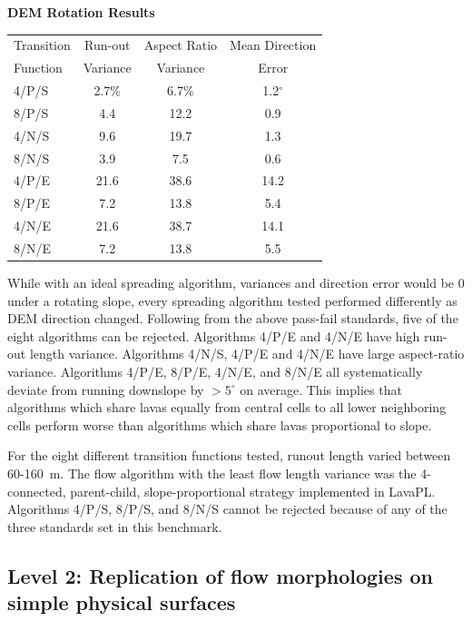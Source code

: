 \documentclass[12pt,letter]{article}
\begin{document}
			\begin{center}
				\textbf{DEM Rotation Results}
				
				\begin{tabular}{l c c c}
					\toprule
					Transition&Run-out&Aspect Ratio&Mean Direction\\
					Function&Variance&Variance&Error\\
					\midrule
					4/P/S &2.7\%&6.7\%&1.2$^{\circ}$\\
					8/P/S &4.4&12.2&0.9\\
					4/N/S &9.6&19.7&1.3\\
					8/N/S &3.9&7.5&0.6\\
					4/P/E &21.6&38.6&14.2\\
					8/P/E &7.2&13.8&5.4\\
					4/N/E &21.6&38.7&14.1\\
					8/N/E &7.2&13.8&5.5\\
			
					\bottomrule
				\end{tabular}
			\end{center}

			While with an ideal spreading algorithm, variances and direction error would be 0 under a rotating slope, every spreading algorithm tested performed differently as DEM direction changed. Following from the above pass-fail standards, five of the eight algorithms can be rejected. Algorithms 4/P/E and 4/N/E have high run-out length variance. Algorithms 4/N/S, 4/P/E and 4/N/E have large aspect-ratio variance. Algorithms 4/P/E, 8/P/E, 4/N/E, and 8/N/E all systematically deviate from running downslope by $>5^{\circ}$ on average. This implies that algorithms which share lavas equally from central cells to all lower neighboring cells perform worse than algorithms which share lavas proportional to slope.
			
			For the eight different transition functions tested, runout length varied between 60-160~m. The flow algorithm with the least flow length variance was the 4-connected, parent-child, slope-proportional strategy implemented in LavaPL. Algorithms 4/P/S, 8/P/S, and 8/N/S cannot be rejected because of any of the three standards set in this benchmark.

	\subsection{Level 2: Replication of flow morphologies on simple physical surfaces}
	
\end{document}
